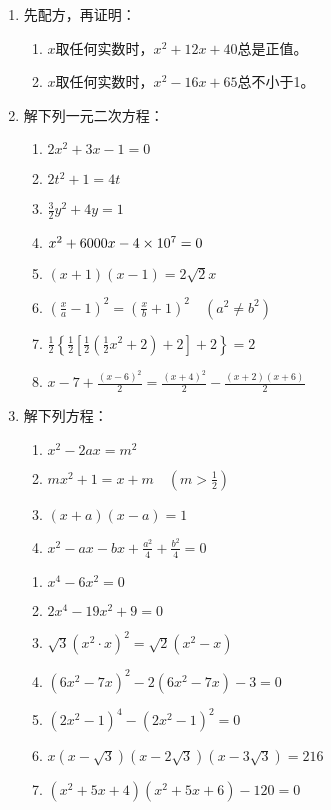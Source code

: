 \begin{enumerate}
\item 先配方，再证明：
\begin{enumerate}
    \item $x$取任何实数时，$x^2+12x+40$总是正值。
    \item $x$取任何实数时，$x^2-16x+65$总不小于1。
\end{enumerate}

\item 解下列一元二次方程：
\begin{enumerate}
    \item $2x^2+3x-1=0$
    \item $2t^2+1=4t$
    \item $\frac{3}{2}y^2+4y=1$
    \item $x^2+6000x-4\times 10^7=0$
    \item $(x+1)(x-1)=2\sqrt{2}x$
    \item $\left(\frac{x}{a}-1\right)^2=\left(\frac{x}{b}+1\right)^2\quad (a^2\ne b^2)$
    \item $\frac{1}{2}\left\{\frac{1}{2}\left[\frac{1}{2}\left(\frac{1}{2}x^2+2\right)+2\right]+2\right\}=2$
    \item $x-7+\frac{(x-6)^2}{2}=\frac{(x+4)^2}{2}-\frac{(x+2)(x+6)}{2}$
\end{enumerate}

\item 解下列方程：
\begin{enumerate}
    \item $x^2-2ax=m^2$
    \item $mx^2+1=x+m\quad (m>\frac{1}{2})$
    \item $(x+a)(x-a)=1$
    \item $x^2-ax-bx+\frac{a^2}{4}+\frac{b^2}{4}=0$
\end{enumerate}

\begin{enumerate}
    \item $x^4-6x^2=0$
    \item $2x^4-19x^2+9=0$
    \item $\sqrt{3}(x^2\cdot x)^2=\sqrt{2}(x^2-x)$
    \item $(6x^2-7x)^2-2(6x^2-7x)-3=0$
    \item $(2x^2-1)^4-(2x^2-1)^2=0$
    \item $x\left(x-\sqrt{3}\right)\left(x-2\sqrt{3}\right)\left(x-3\sqrt{3}\right)=216$
    \item $(x^2+5x+4)(x^2+5x+6)-120=0$
\end{enumerate}


\end{enumerate}
